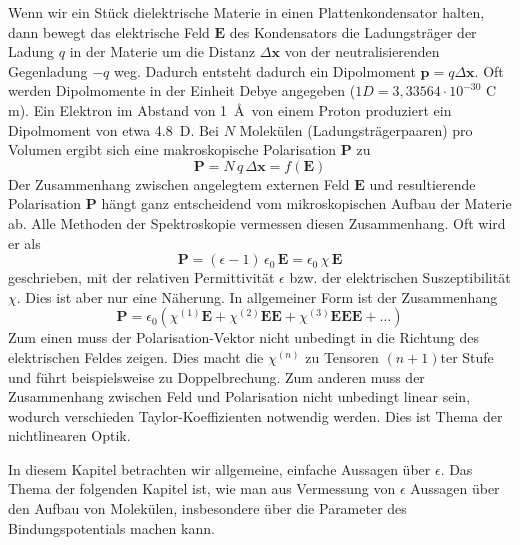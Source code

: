 Wenn wir ein Stück dielektrische Materie in einen Plattenkondensator halten, dann bewegt das elektrische Feld $\mathbf{E}$ des Kondensators die Ladungsträger der Ladung $q$ in der Materie um  die Distanz $\Delta  \mathbf{x}$ von der neutralisierenden Gegenladung $-q$ weg. Dadurch entsteht dadurch ein Dipolmoment $\mathbf{p} = q \Delta \mathbf{x}$. Oft werden Dipolmomente in der Einheit Debye angegeben ($1 D = 3{,}33564 \cdot 10^{-30}$ C  m). Ein Elektron im Abstand von 1~\AA\ von einem Proton produziert ein Dipolmoment von etwa 4.8~D. Bei $N$ Molekülen (Ladungsträgerpaaren) pro Volumen ergibt sich eine makroskopische Polarisation $\mathbf{P}$ zu
\begin{equation}
\mathbf{P} = N \, q \, \Delta \mathbf{x} = f(\mathbf{E})
\end{equation}
Der Zusammenhang zwischen angelegtem externen Feld $\mathbf{E}$ und resultierende 
Polarisation $\mathbf{P}$ hängt ganz entscheidend vom mikroskopischen Aufbau der Materie ab. Alle Methoden der Spektroskopie vermessen diesen Zusammenhang. Oft wird er als 
\begin{equation}
 \mathbf{P} =  (\epsilon - 1) \, \epsilon_0 \, \mathbf{E} = \epsilon_0 \,\chi \, \mathbf{E} 
 \label{eq:diel_p_lin}
\end{equation}
geschrieben, mit der relativen Permittivität $\epsilon$ bzw. der elektrischen Suszeptibilität $\chi$. Dies ist aber nur eine Näherung. In allgemeiner Form ist der Zusammenhang
\begin{equation}
\mathbf{P}  = \epsilon_0 \left( \chi^{(1)} \mathbf{E} + \chi^{(2)} \mathbf{E}  \mathbf{E} +  \chi^{(3)} \mathbf{E}  \mathbf{E}  \mathbf{E}  + \dots \right)
\end{equation}
Zum einen muss der Polarisation-Vektor nicht unbedingt in die Richtung des elektrischen Feldes zeigen. Dies macht die $\chi^{(n)}$ zu Tensoren $(n+1)$ter Stufe und führt beispielsweise zu Doppelbrechung. Zum anderen muss der Zusammenhang zwischen Feld und Polarisation nicht unbedingt linear sein, wodurch verschieden Taylor-Koeffizienten notwendig werden. Dies ist Thema der nichtlinearen Optik.

In diesem Kapitel betrachten wir allgemeine, einfache Aussagen über $\epsilon$.
Das Thema der folgenden Kapitel ist, wie man aus Vermessung von $\epsilon$ Aussagen über den Aufbau  von Molekülen, insbesondere über die Parameter des Bindungspotentials machen kann.

